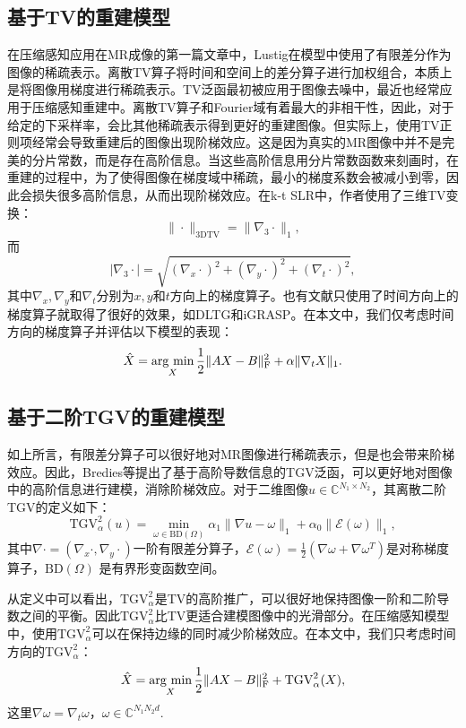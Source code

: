 \subsection{基于TV的重建模型}
在压缩感知应用在MR成像的第一篇文章中，Lustig\cite{Lustig2008Compressed}在模型中使用了有限差分作为图像的稀疏表示。离散TV算子将时间和空间上的差分算子进行加权组合，本质上是将图像用梯度进行稀疏表示。TV泛函最初被应用于图像去噪中\cite{rof}，最近也经常应用于压缩感知重建中。离散TV算子和Fourier域有着最大的非相干性，因此，对于给定的下采样率，会比其他稀疏表示得到更好的重建图像。但实际上，使用TV正则项经常会导致重建后的图像出现阶梯效应。这是因为真实的MR图像中并不是完美的分片常数，而是存在高阶信息。当这些高阶信息用分片常数函数来刻画时，在重建的过程中，为了使得图像在梯度域中稀疏，最小的梯度系数会被减小到零，因此会损失很多高阶信息，从而出现阶梯效应。在k-t SLR\cite{Sajan2011Accelerated}中，作者使用了三维TV变换：
$$\|\cdot\|_\mathrm{3DTV} = \|\nabla_3\cdot\|_1,$$
而
$$|\nabla_3\cdot|=\sqrt{(\nabla_x \cdot)^2 + (\nabla_y \cdot)^2 + (\nabla_t \cdot)^2},$$
其中$\nabla_x,\nabla_y$和$\nabla_t$分别为$x,y$和$t$方向上的梯度算子。也有文献只使用了时间方向上的梯度算子就取得了很好的效果，如DLTG\cite{caballero2014dictionary}和iGRASP\cite{igrasp}。在本文中，我们仅考虑时间方向的梯度算子并评估以下模型的表现：
\begin{equation}
\hat{X} = \argmin_X \frac{1}{2}\|AX-B\|_\mathrm{F}^2 + \alpha\|\nabla_t X\|_1.
\end{equation}

\subsection{基于二阶TGV的重建模型}
如上所言，有限差分算子可以很好地对MR图像进行稀疏表示，但是也会带来阶梯效应。因此，Bredies\cite{bredies2010total}等提出了基于高阶导数信息的TGV泛函，可以更好地对图像中的高阶信息进行建模，消除阶梯效应。对于二维图像$u\in \mathbb{C}^{N_1\times N_2}$，其离散二阶TGV的定义如下：
$$\mathrm{TGV}_\alpha^2(u)=\min_{\omega\in \mathrm{BD}(\Omega)}\alpha_1\|\nabla u-\omega\|_1 + \alpha_0\|\mathcal{E}(\omega)\|_1,$$
其中$\nabla\cdot=(\nabla_x\cdot, \nabla_y\cdot)$一阶有限差分算子，$\mathcal{E}(\omega)=\frac{1}{2}(\nabla\omega+\nabla\omega^{T})$是对称梯度算子，$\mathrm{BD}(\Omega)$ 是有界形变函数空间。

从定义中可以看出，$\mathrm{TGV}_\alpha^2$是TV的高阶推广，可以很好地保持图像一阶和二阶导数之间的平衡。因此$\mathrm{TGV}_\alpha^2$比TV更适合建模图像中的光滑部分。在压缩感知模型中，使用$\mathrm{TGV}_\alpha^2$可以在保持边缘的同时减少阶梯效应。在本文中，我们只考虑时间方向的$\mathrm{TGV}_\alpha^2$：
\begin{equation}
\hat{X} = \argmin_X \frac{1}{2}\|AX-B\|_\mathrm{F}^2+\mathrm{TGV}_\alpha^2(X),
\end{equation}
这里$\nabla \omega = \nabla_t \omega$，$\omega\in \mathbb{C}^{N_1N_2d}$.

